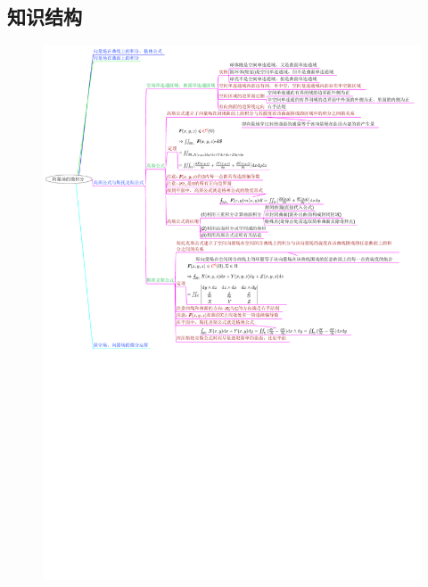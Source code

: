 \documentclass[12pt,UTF8,fleqn]{ctexart}
\begin{document}
\subsection{知识结构}
\begin{figure}[H]
\begin{center}
\includegraphics[height=1\textheight,angle=0]{20190613-1.pdf}
\end{center}
\end{figure}
\end{document}
